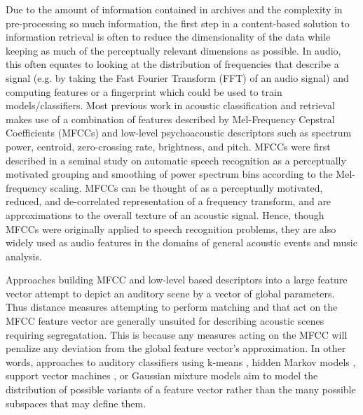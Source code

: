 \documentclass[a4paper,10pt,final]{ThesisStyle}
\begin{document}
Due to the amount of information contained in archives and the complexity in pre-processing so much information, the first step in a content-based solution to information retrieval is often to reduce the dimensionality of the data while keeping as much of the perceptually relevant dimensions as possible.  In audio, this often equates to looking at the distribution of frequencies that describe a signal (e.g. by taking the Fast Fourier Transform (FFT) of an audio signal) and computing features or a fingerprint which could be used to train models/classifiers.  Most previous work in acoustic classification and retrieval makes use of a combination of features described by Mel-Frequency Cepstral Coefficients (MFCCs) and low-level psychoacoustic descriptors \cite{Temko2007,Guo2003a,McKinney2003,Allamanche2001} such as spectrum power, centroid, zero-crossing rate, brightness, and pitch.  MFCCs were first described in a seminal study on automatic speech recognition \cite{Davis1980} as a perceptually motivated grouping and smoothing of power spectrum bins according to the Mel-frequency scaling.  MFCCs can be thought of as a perceptually motivated, reduced, and de-correlated representation of a frequency transform, and are approximations to the overall texture of an acoustic signal.  Hence, though MFCCs were originally applied to speech recognition problems, they are also widely used as audio features in the domains of general acoustic events \cite{Temko2007} and music \cite{Pampalk2006a,McKinney2003} analysis.  




Approaches building MFCC and low-level based descriptors into a large feature vector attempt to depict an auditory scene by a vector of global parameters. Thus distance measures attempting to perform matching and that act on the MFCC feature vector are generally unsuited for describing acoustic scenes requiring segregatation.  This is because any measures acting on the MFCC will penalize any deviation from the global feature vector's approximation.  In other words, approaches to auditory classifiers using k-means \cite{Harma2005,Eronen2006,Allamanche2001}, hidden Markov models \cite{Eronen2006,Mesaros2010}, support vector machines \cite{Guo2003a}, or Gaussian mixture models \cite{Wang2011,Aucouturier2007a,Pampalk2006a} aim to model the distribution of possible variants of a feature vector rather than the many possible subspaces that may define them. 
\end{document}
